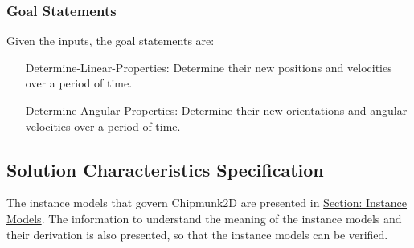 \documentclass[12pt]{article}
\begin{document}
\subsubsection{Goal Statements}
\label{Sec:GoalStmt}
Given the inputs, the goal statements are:
\begin{itemize}
\item[Determine-Linear-Properties:\phantomsection\label{linearGS}]Determine their new positions and velocities over a period of time.
\item[Determine-Angular-Properties:\phantomsection\label{angularGS}]Determine their new orientations and angular velocities over a period of time.
\end{itemize}
\subsection{Solution Characteristics Specification}
\label{Sec:SolCharSpec}
The instance models that govern Chipmunk2D are presented in \hyperref[Sec:IMs]{Section: Instance Models}. The information to understand the meaning of the instance models and their derivation is also presented, so that the instance models can be verified.
\end{document}
